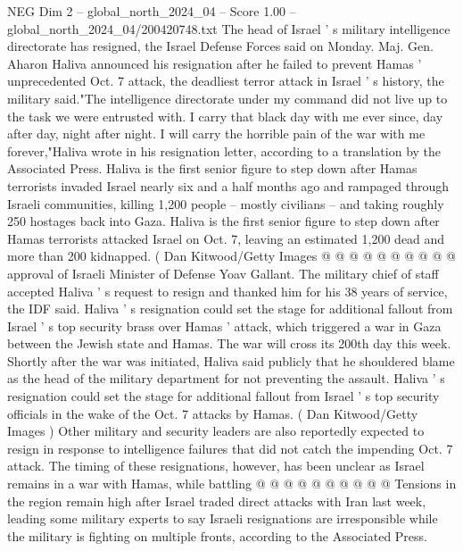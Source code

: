 \begin{textsample}{NEG Dim 2 – global\_north\_2024\_04 – Score 1.00 – global\_north\_2024\_04/200420748.txt}  \label{ex:f2_neg_188}
The head of Israel ' s military intelligence directorate has resigned, the Israel Defense Forces said on Monday.
Maj.
Gen.
Aharon Haliva announced his resignation after he failed to prevent Hamas ' unprecedented Oct. 7 attack, the deadliest terror attack in Israel ' s history, the military said."The intelligence directorate under my command did not live up to the task we were entrusted with.
I carry that black day with me ever since, day after day, night after night.
I will carry the horrible pain of the war with me forever,"Haliva wrote in his resignation letter, according to a translation by the Associated Press.
Haliva is the first senior figure to step down after Hamas terrorists invaded Israel nearly six and a half months ago and rampaged through Israeli communities, killing 1,200 people -- mostly civilians -- and taking roughly 250 hostages back into Gaza.
Haliva is the first senior figure to step down after Hamas terrorists attacked Israel on Oct. 7, leaving an estimated 1,200 dead and more than 200 kidnapped. ( Dan Kitwood/Getty Images @ @ @ @ @ @ @ @ @ @ approval of Israeli Minister of Defense Yoav Gallant.
The military chief of staff accepted Haliva ' s request to resign and thanked him for his 38 years of service, the IDF said.
Haliva ' s resignation could set the stage for additional fallout from Israel ' s top security brass over Hamas ' attack, which triggered a war in Gaza between the Jewish state and Hamas.
The war will cross its 200th day this week.
Shortly after the war was initiated, Haliva said publicly that he shouldered blame as the head of the military department for not preventing the assault.
Haliva ' s resignation could set the stage for additional fallout from Israel ' s top security officials in the wake of the Oct. 7 attacks by Hamas. ( Dan Kitwood/Getty Images ) Other military and security leaders are also reportedly expected to resign in response to intelligence failures that did not catch the impending Oct. 7 attack.
The timing of these resignations, however, has been unclear as Israel remains in a war with Hamas, while battling @ @ @ @ @ @ @ @ @ @ Tensions in the region remain high after Israel traded direct attacks with Iran last week, leading some military experts to say Israeli resignations are irresponsible while the military is fighting on multiple fronts, according to the Associated Press.

\end{textsample}
